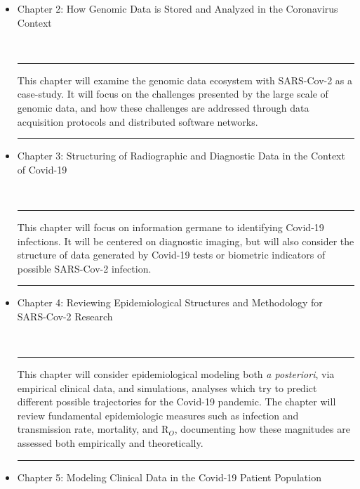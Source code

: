 \documentclass{statsoc}
\newenvironment{summary}{\\\vspace{-4pt}%
%
%
\noindent\hfil\textcolor{rgrey!50!purple}{\rule{0.5\textwidth}{.4pt}}\hfil

\hspace{-2cm}\begin{minipage}{1.02\textwidth}\fontfamily{phv}\fontsize{9}{11}\selectfont}%
{\\\vspace{-1em}\end{minipage}
{\begin{center}\textcolor{rgrey!50!yellow}{\rule{0.5\textwidth}{.4pt}}\end{center}}
\vspace{2em}}%
\begin{document}
{\begin{description}
\begin{itemize}
\begin{summary}
This chapter will consider data pertaining to scientists' 
investigation of SARS-Cov-2's viral mechanisms.  It will 
consider how data modeling the pathogen's proteins, 
physical structure, and interactions with human cells 
is collected and utilized.  Emphasis will be placed 
on cheminformatic pipelines and protocols for 
working with molecular-biological information.   
\end{summary}

\item Chapter 2: How Genomic Data is Stored and Analyzed in the Coronavirus Context

\begin{summary}
This chapter will examine the genomic data ecosystem with SARS-Cov-2 
as a case-study.  It will focus on the challenges presented 
by the large scale of genomic data, and how these challenges 
are addressed through data acquisition protocols and 
distributed software networks. 
\end{summary}

\item Chapter 3: Structuring of Radiographic and Diagnostic Data in the Context of Covid-19

\begin{summary}
This chapter will focus on information germane to identifying Covid-19 infections.  
It will be centered on diagnostic imaging, but will also consider 
the structure of data generated by Covid-19 tests or 
biometric indicators of possible SARS-Cov-2 infection.
\end{summary}

\item Chapter 4: Reviewing Epidemiological Structures and Methodology for SARS-Cov-2 Research

\begin{summary}
This chapter will consider epidemiological modeling both \textit{a posteriori}, 
via empirical clinical data, and simulations, analyses which try to 
predict different possible trajectories for the Covid-19 pandemic.  
The chapter will review fundamental epidemiologic measures such 
as infection and transmission rate, mortality, and R$_O$, documenting 
how these magnitudes are assessed both empirically and theoretically. 
\end{summary}

\item Chapter 5: Modeling Clinical Data in the Covid-19 Patient Population  


\end{itemize}
\end{description}}
\end{document}
